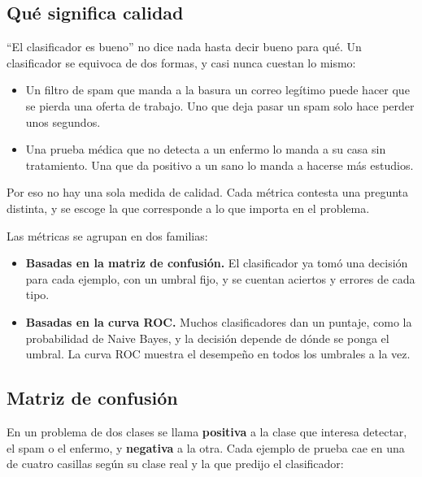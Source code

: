 \documentclass[11pt,letterpaper]{article}
\begin{document}
\subsection*{Qué significa calidad}

``El clasificador es bueno'' no dice nada hasta decir bueno para qué.
Un clasificador se equivoca de dos formas, y casi nunca cuestan lo
mismo:

\begin{itemize}[itemsep=0.3em]
    \item Un filtro de spam que manda a la basura un correo legítimo
          puede hacer que se pierda una oferta de trabajo. Uno que deja
          pasar un spam solo hace perder unos segundos.
    \item Una prueba médica que no detecta a un enfermo lo manda a su
          casa sin tratamiento. Una que da positivo a un sano lo manda
          a hacerse más estudios.
\end{itemize}

Por eso no hay una sola medida de calidad. Cada métrica contesta una
pregunta distinta, y se escoge la que corresponde a lo que importa en
el problema.

Las métricas se agrupan en dos familias:

\begin{itemize}[itemsep=0.3em]
    \item \textbf{Basadas en la matriz de confusión.} El clasificador
          ya tomó una decisión para cada ejemplo, con un umbral fijo, y
          se cuentan aciertos y errores de cada tipo.
    \item \textbf{Basadas en la curva ROC.} Muchos clasificadores dan
          un puntaje, como la probabilidad de Naive Bayes, y la
          decisión depende de dónde se ponga el umbral. La curva ROC
          muestra el desempeño en todos los umbrales a la vez.
\end{itemize}


\subsection*{Matriz de confusión}

En un problema de dos clases se llama \textbf{positiva} a la clase que
interesa detectar, el spam o el enfermo, y \textbf{negativa} a la
otra. Cada ejemplo de prueba cae en una de cuatro casillas según su
clase real y la que predijo el clasificador:
\end{document}
